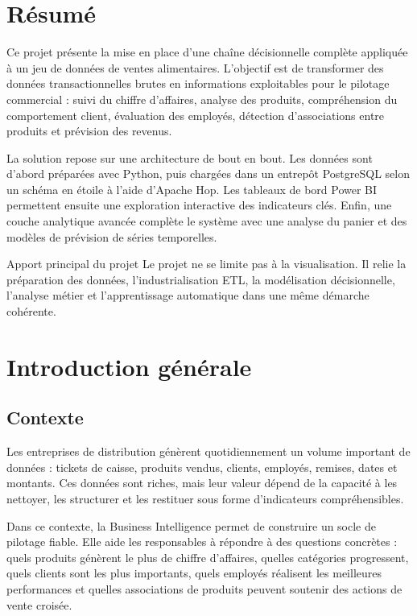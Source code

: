 \documentclass[12pt,a4paper,twoside]{report}
\begin{document}
\chapter*{Résumé}

Ce projet présente la mise en place d'une chaîne décisionnelle complète appliquée à un jeu de données de ventes alimentaires. L'objectif est de transformer des données transactionnelles brutes en informations exploitables pour le pilotage commercial : suivi du chiffre d'affaires, analyse des produits, compréhension du comportement client, évaluation des employés, détection d'associations entre produits et prévision des revenus.

La solution repose sur une architecture de bout en bout. Les données sont d'abord préparées avec Python, puis chargées dans un entrepôt PostgreSQL selon un schéma en étoile à l'aide d'Apache Hop. Les tableaux de bord Power BI permettent ensuite une exploration interactive des indicateurs clés. Enfin, une couche analytique avancée complète le système avec une analyse du panier et des modèles de prévision de séries temporelles.

\begin{infobox}{Apport principal du projet}
Le projet ne se limite pas à la visualisation. Il relie la préparation des données, l'industrialisation ETL, la modélisation décisionnelle, l'analyse métier et l'apprentissage automatique dans une même démarche cohérente.
\end{infobox}

\chapter{Introduction générale}

\section{Contexte}

Les entreprises de distribution génèrent quotidiennement un volume important de données : tickets de caisse, produits vendus, clients, employés, remises, dates et montants. Ces données sont riches, mais leur valeur dépend de la capacité à les nettoyer, les structurer et les restituer sous forme d'indicateurs compréhensibles.

Dans ce contexte, la Business Intelligence permet de construire un socle de pilotage fiable. Elle aide les responsables à répondre à des questions concrètes : quels produits génèrent le plus de chiffre d'affaires, quelles catégories progressent, quels clients sont les plus importants, quels employés réalisent les meilleures performances et quelles associations de produits peuvent soutenir des actions de vente croisée.
\end{document}
